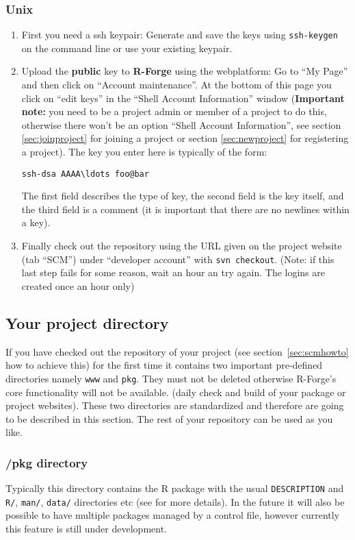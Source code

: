 \documentclass[a4paper]{article}
\begin{document}
\subsubsection{Unix}

\begin{enumerate}
\item First you need a ssh keypair: Generate and save the keys
  using \texttt{ssh-keygen} on the command line or use your existing keypair.  
\item Upload the \textbf{public} key to \textbf{R-Forge} using the webplatform: Go to
  ``My Page'' and then click on ``Account maintenance''. At the bottom
  of this page you click on ``edit keys'' in the ``Shell Account
  Information'' window (\textbf{Important note:} you need to be a project admin
  or member of a project to do this, otherwise there won't be an
  option ``Shell Account Information'', see section
  \ref{sec:joinproject} for joining a project or section
  \ref{sec:newproject} for registering a project).
  The key you enter here is typically of the form:
\begin{verbatim}
ssh-dsa AAAA\ldots foo@bar
\end{verbatim}
  The first field
  describes the type of key, the second field is the key itself, and
  the third field is a comment (it is important that there are no
  newlines within a key).
\item Finally check out the repository using the URL given on the
  project website (tab ``SCM'') under ``developer account'' with
  \texttt{svn checkout}. (Note: if this last step
  fails for some reason, wait an hour an try again. The logins are
  created once an hour only)
\end{enumerate}

\subsection{Your project directory}
If you have checked out the repository of your project (see
section~\ref{sec:scmhowto} how to achieve this) for the first
time it contains two important pre-defined directories namely
\texttt{www} and \texttt{pkg}. They must not be
deleted otherwise R-Forge's core functionality will not be available.
(daily check and build of your package or project websites).
These two
directories are standardized and therefore are going to be described
in this section. The rest of your repository can be used as you like.

\subsubsection{/pkg directory}
Typically this directory contains the R package with the usual
\texttt{DESCRIPTION} and \texttt{R/}, \texttt{man/}, \texttt{data/}
directories etc (see \cite{Rcore:writing_R_extensions}
for more details).
In the future it will also be possible to have multiple
packages managed by a control file, however currently this feature is still
under development.
\end{document}
